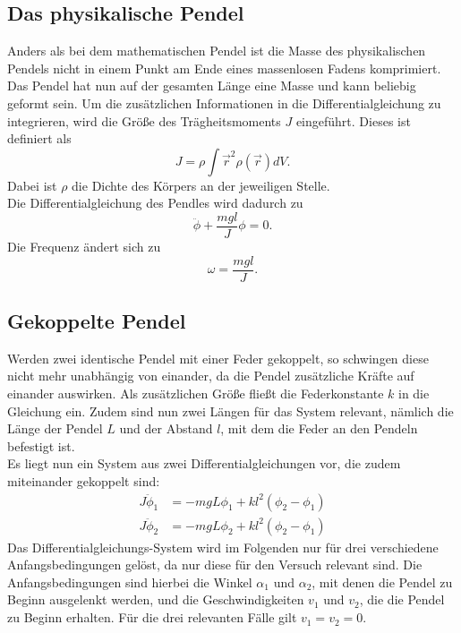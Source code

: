 \subsection{Das physikalische Pendel}
Anders als bei dem mathematischen Pendel ist die Masse des physikalischen Pendels nicht in einem Punkt am Ende eines massenlosen Fadens komprimiert.
Das Pendel hat nun auf der gesamten Länge eine Masse und kann beliebig geformt sein. Um die zusätzlichen Informationen in die Differentialgleichung
zu integrieren, wird die Größe des Trägheitsmoments $J$ eingeführt. Dieses ist definiert als
\begin{equation}
    J=\rho\int{\vec{r}^2\rho(\vec{r})dV}.
\end{equation}
Dabei ist $\rho$ die Dichte des Körpers an der jeweiligen Stelle.
\\
Die Differentialgleichung des Pendles wird dadurch zu
\begin{equation}
    \ddot{\phi}+\frac{mgl}{J}\phi=0.
\end{equation}
Die Frequenz ändert sich zu
\begin{equation}
    \omega=\frac{mgl}{J}.
\end{equation}

\subsection{Gekoppelte Pendel}
Werden zwei identische Pendel mit einer Feder gekoppelt, so schwingen diese nicht mehr unabhängig von einander, da die Pendel zusätzliche Kräfte auf
einander auswirken. Als zusätzlichen Größe fließt die Federkonstante $k$ in die Gleichung ein. Zudem sind nun zwei Längen für das System relevant, nämlich die
Länge der Pendel $L$ und der Abstand $l$, mit dem die Feder an den Pendeln befestigt ist.
\\
Es liegt nun ein System aus zwei Differentialgleichungen vor, die zudem miteinander gekoppelt sind:
\begin{align}
    J\ddot{\phi}_1&=-mgL\phi_1+kl^2(\phi_2-\phi_1)\\
    J\ddot{\phi}_2&=-mgL\phi_2+kl^2(\phi_2-\phi_1)
\end{align}
Das Differentialgleichungs-System wird im Folgenden nur für drei verschiedene Anfangsbedingungen gelöst, da nur diese für den Versuch relevant sind.
Die Anfangsbedingungen sind hierbei die Winkel $\alpha_1$ und $\alpha_2$, mit denen die Pendel zu Beginn ausgelenkt werden, und die Geschwindigkeiten
$v_1$ und $v_2$, die die Pendel zu Beginn erhalten. Für die drei relevanten Fälle gilt $v_1=v_2=0$.

